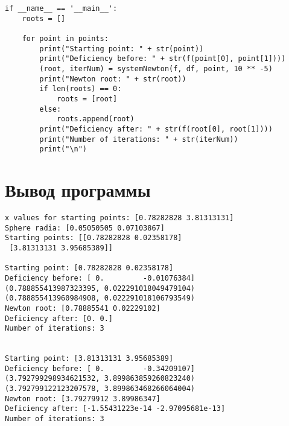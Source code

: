 \documentclass[14pt, a4paper]{article}
\begin{document}
\begin{lstlisting}
if __name__ == '__main__':
    roots = []

    for point in points:
        print("Starting point: " + str(point))
        print("Deficiency before: " + str(f(point[0], point[1])))
        (root, iterNum) = systemNewton(f, df, point, 10 ** -5)
        print("Newton root: " + str(root))
        if len(roots) == 0:
            roots = [root]
        else:
            roots.append(root)
        print("Deficiency after: " + str(f(root[0], root[1])))
        print("Number of iterations: " + str(iterNum))
        print("\n")
\end{lstlisting}

  \section{Вывод программы}
\begin{verbatim}
x values for starting points: [0.78282828 3.81313131]
Sphere radia: [0.05050505 0.07103867]
Starting points: [[0.78282828 0.02358178]
 [3.81313131 3.95685389]]

Starting point: [0.78282828 0.02358178]
Deficiency before: [ 0.         -0.01076384]
(0.788855413987323395, 0.022291018049479104)
(0.788855413960984908, 0.022291018106793549)
Newton root: [0.78885541 0.02229102]
Deficiency after: [0. 0.]
Number of iterations: 3


Starting point: [3.81313131 3.95685389]
Deficiency before: [ 0.         -0.34209107]
(3.792799298934621532, 3.899863859260823240)
(3.792799122123207578, 3.899863468266064004)
Newton root: [3.79279912 3.89986347]
Deficiency after: [-1.55431223e-14 -2.97095681e-13]
Number of iterations: 3
\end{verbatim}
\end{document}
